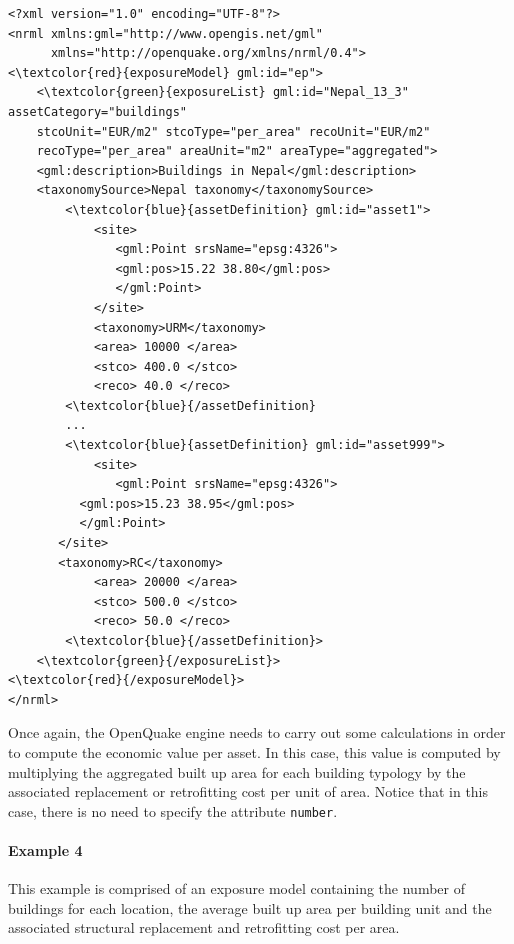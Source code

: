 \begin{Verbatim}[frame=single, commandchars=\\\{\}, samepage=false]
<?xml version="1.0" encoding="UTF-8"?>
<nrml xmlns:gml="http://www.opengis.net/gml"
      xmlns="http://openquake.org/xmlns/nrml/0.4">
<\textcolor{red}{exposureModel} gml:id="ep">
    <\textcolor{green}{exposureList} gml:id="Nepal_13_3" assetCategory="buildings" 
    stcoUnit="EUR/m2" stcoType="per_area" recoUnit="EUR/m2" 
    recoType="per_area" areaUnit="m2" areaType="aggregated">
    <gml:description>Buildings in Nepal</gml:description>
    <taxonomySource>Nepal taxonomy</taxonomySource>
        <\textcolor{blue}{assetDefinition} gml:id="asset1">
            <site>
               <gml:Point srsName="epsg:4326">
               <gml:pos>15.22 38.80</gml:pos>
               </gml:Point>
            </site>
            <taxonomy>URM</taxonomy>
            <area> 10000 </area>
            <stco> 400.0 </stco>
            <reco> 40.0 </reco>
        <\textcolor{blue}{/assetDefinition} 
        ...
        <\textcolor{blue}{assetDefinition} gml:id="asset999">
            <site>
               <gml:Point srsName="epsg:4326">
	      <gml:pos>15.23 38.95</gml:pos>
	      </gml:Point>
	   </site>
	   <taxonomy>RC</taxonomy>
            <area> 20000 </area>
            <stco> 500.0 </stco>
            <reco> 50.0 </reco>
        <\textcolor{blue}{/assetDefinition}> 
    <\textcolor{green}{/exposureList}>
<\textcolor{red}{/exposureModel}>
</nrml>
\end{Verbatim}

Once again, the OpenQuake engine needs to carry out some calculations in order to compute the economic value per asset. In this case, this value is computed by multiplying the aggregated built up area for each building typology by the associated replacement or retrofitting cost per unit of area. Notice that in this case, there is no need to specify the attribute \Verb+number+.

 \paragraph{Example 4}
This example is comprised of an \gls{exposure model} containing the number of buildings for each location, the average built up area per building unit and the associated structural replacement and retrofitting cost per area. 

